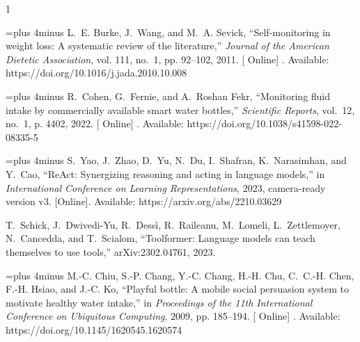 \documentclass[conference]{IEEEtran}
\providecommand{\DIFadd}[1]{{\protect\color{blue} \sf #1}} %
\providecommand{\DIFaddbegin}{} %
\providecommand{\DIFaddend}{} %
\begin{document}
\balance

\begin{thebibliography}{1}
\providecommand{\url}[1]{#1}
\providecommand{\newblock}{\relax}
\providecommand{\bibinfo}[2]{#2}
\providecommand{\BIBentrySTDinterwordspacing}{\spaceskip=0pt\relax}
\providecommand{\BIBentryALTinterwordstretchfactor}{4}
\providecommand{\BIBentryALTinterwordspacing}{\spaceskip=\fontdimen2\font plus
\BIBentryALTinterwordstretchfactor\fontdimen3\font minus \fontdimen4\font\relax}
\providecommand{\BIBforeignlanguage}[2]{{%
\expandafter\ifx\csname l@#1\endcsname\relax
\typeout{** WARNING: IEEEtran.bst: No hyphenation pattern has been}%
\typeout{** loaded for the language `#1'. Using the pattern for}%
\typeout{** the default language instead.}%
\else
\language=\csname l@#1\endcsname
\fi
#2}}
\providecommand{\BIBdecl}{\relax}
\BIBdecl

\DIFaddbegin \BIBentryALTinterwordspacing
\DIFaddend L.~E. Burke, J.~Wang, and M.~A. Sevick, ``Self-monitoring in weight loss: A systematic review of the literature,'' \emph{Journal of the American Dietetic Association}, vol. 111, no.~1, pp. 92--102, 2011. \DIFaddbegin [\DIFadd{Online}]\DIFadd{. Available: }\url{https://doi.org/10.1016/j.jada.2010.10.008}
\BIBentrySTDinterwordspacing
\DIFaddend 

\DIFaddbegin \BIBentryALTinterwordspacing
\DIFaddend R.~Cohen, G.~Fernie, and A.~{Roshan Fekr}, ``Monitoring fluid intake by commercially available smart water bottles,'' \emph{Scientific Reports}, vol.~12, no.~1, p. 4402, 2022. \DIFaddbegin [\DIFadd{Online}]\DIFadd{. Available: }\url{https://doi.org/10.1038/s41598-022-08335-5}
\BIBentrySTDinterwordspacing
\DIFaddend 

\BIBentryALTinterwordspacing
S.~Yao, J.~Zhao, D.~Yu, N.~Du, I.~Shafran, K.~Narasimhan, and Y.~Cao, ``{ReAct}: Synergizing reasoning and acting in language models,'' in \emph{International Conference on Learning Representations}, 2023, camera-ready version v3. [Online]. Available: \url{https://arxiv.org/abs/2210.03629}
\BIBentrySTDinterwordspacing

T.~Schick, J.~Dwivedi-Yu, R.~Dess{\`i}, R.~Raileanu, M.~Lomeli, L.~Zettlemoyer, N.~Cancedda, and T.~Scialom, ``Toolformer: Language models can teach themselves to use tools,'' arXiv:2302.04761, 2023.

\DIFaddbegin \BIBentryALTinterwordspacing
\DIFaddend M.-C. Chiu, S.-P. Chang, Y.-C. Chang, H.-H. Chu, C.~C.-H. Chen, F.-H. Hsiao, and J.-C. Ko, ``Playful bottle: A mobile social persuasion system to motivate healthy water intake,'' in \emph{Proceedings of the 11th International Conference on Ubiquitous Computing}, 2009, pp. 185--194. \DIFaddbegin [\DIFadd{Online}]\DIFadd{. Available: }\url{https://doi.org/10.1145/1620545.1620574}
\BIBentrySTDinterwordspacing
\DIFaddend 


\end{thebibliography}
\end{document}
